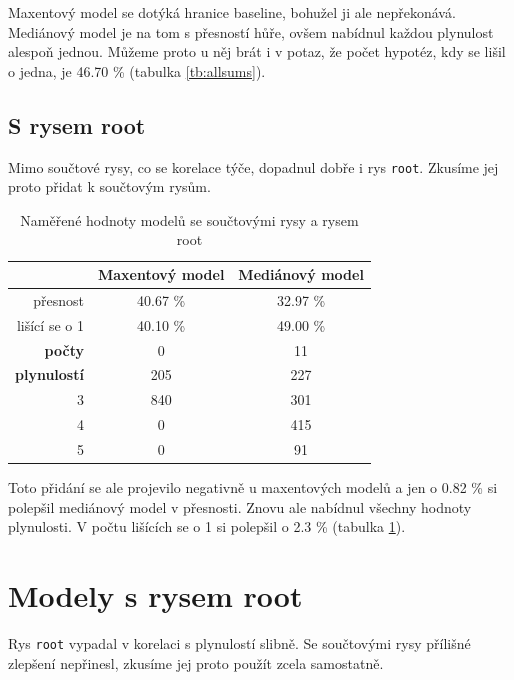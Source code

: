 \documentclass[12pt,a4paper]{report}
\begin{document}
Maxentový model se dotýká hranice baseline, bohužel ji ale nepřekonává. Mediánový model je na tom s přesností hůře, ovšem nabídnul každou plynulost alespoň jednou. Můžeme proto u něj brát i v potaz, že počet hypotéz, kdy se lišil o jedna, je 46.70 \% (tabulka \ref{tb:allsums}).

\subsection{S rysem root}
Mimo součtové rysy, co se korelace týče, dopadnul dobře i rys \texttt{root}. Zkusíme jej proto přidat k součtovým rysům.

\begin{table}[!htbp]
\begin{center}
\begin{tabular}{|r|c|c|}
\hline
 & \textbf{Maxentový model} & \textbf{Mediánový model} \\
 \hline
     přesnost & 40.67 \%  & 32.97 \%  \\
\hline
lišící se o 1 & 40.10 \% & 49.00 \%  \\
\hline
     \textbf{počty} \quad 1 & \color{red}0   & \color{OliveGreen}11   \\
\textbf{plynulostí} \quad 2 & 205 & \color{OliveGreen}227   \\
                          3 & 840 & \color{OliveGreen}301 \\
                          4 & \color{red}0   & \color{OliveGreen}415 \\
                          5 & \color{red}0   & \color{OliveGreen}91  \\
\hline
\end{tabular}
\caption{Naměřené hodnoty modelů se součtovými rysy a rysem root}\label{tb:allsumsroot}
\end{center}
\end{table}

Toto přidání se ale projevilo negativně u maxentových modelů a jen o 0.82 \% si polepšil mediánový model v přesnosti. Znovu ale nabídnul všechny hodnoty plynulosti. V počtu lišících se o 1 si polepšil o 2.3 \% (tabulka \ref{tb:allsumsroot}).


\section{Modely s rysem root}
Rys \texttt{root} vypadal v korelaci s plynulostí slibně. Se součtovými rysy přílišné zlepšení nepřinesl, zkusíme jej proto použít zcela samostatně.
\end{document}
